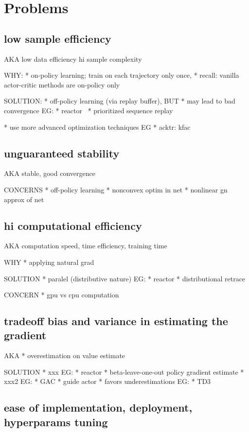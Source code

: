 \section{Problems}

\subsection{low sample efficiency}
AKA
low data efficiency
hi sample complexity

WHY:
* on-policy learning; train on each trajectory only once,
  * recall: vanilla actor-critic methods are on-policy only

SOLUTION:
* off-policy learning (via replay buffer),
  BUT
  * may lead to bad convergence
  EG:
  * reactor~\cite{Gruslys2018}
    * prioritized sequence replay

* use more advanced optimization techniques
EG
* acktr: kfac


\subsection{unguaranteed stability}
AKA
stable, good convergence

CONCERNS
* off-policy learning
* nonconvex optim in net
* nonlinear gn approx of net

\subsection{hi computational efficiency}
AKA
computation speed,
time efficiency,
training time

WHY
* applying natural grad

SOLUTION
* paralel (distributive nature)
  EG:
  * reactor
    * distributional retrace

CONCERN
* gpu vs cpu computation

\subsection{tradeoff bias and variance in estimating the gradient}
AKA
* overestimation on value estimate

SOLUTION
* xxx
  EG:
  * reactor
    * beta-leave-one-out policy gradient estimate
* xxx2
  EG:
  * GAC
    * guide actor
* favors underestimations
  EG:
  * TD3

\subsection{ease of implementation, deployment, hyperparams tuning}


